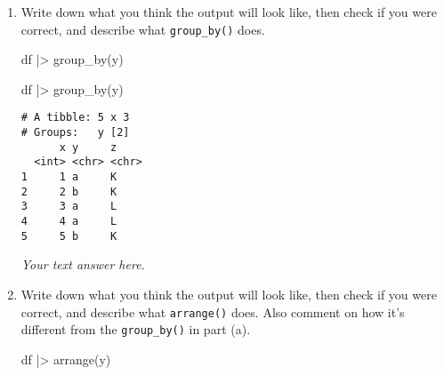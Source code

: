 \documentclass[
  letterpaper,
  DIV=11,
  numbers=noendperiod]{scrreprt}
\newenvironment{Shaded}{\begin{snugshade}}{\end{snugshade}}
\newcommand{\FunctionTok}[1]{\textcolor[rgb]{0.28,0.35,0.67}{#1}}
\newcommand{\NormalTok}[1]{\textcolor[rgb]{0.00,0.23,0.31}{#1}}
\newcommand{\SpecialCharTok}[1]{\textcolor[rgb]{0.37,0.37,0.37}{#1}}
\begin{document}
\begin{enumerate}
\def\labelenumi{\alph{enumi}.}
\item
  Write down what you think the output will look like, then check if you
  were correct, and describe what \texttt{group\_by()} does.

\begin{Shaded}
\begin{Highlighting}[]
\NormalTok{df }\SpecialCharTok{|\textgreater{}}
  \FunctionTok{group\_by}\NormalTok{(y)}
\end{Highlighting}
\end{Shaded}

  \begin{tcolorbox}[enhanced jigsaw, left=2mm, rightrule=.15mm, bottomtitle=1mm, opacitybacktitle=0.6, leftrule=.75mm, opacityback=0, colframe=quarto-callout-note-color-frame, bottomrule=.15mm, coltitle=black, toptitle=1mm, colback=white, titlerule=0mm, colbacktitle=quarto-callout-note-color!10!white, title={Answer}, toprule=.15mm, breakable, arc=.35mm]

\begin{Shaded}
\begin{Highlighting}[]
\NormalTok{df }\SpecialCharTok{|\textgreater{}}
  \FunctionTok{group\_by}\NormalTok{(y)}
\end{Highlighting}
\end{Shaded}

\begin{verbatim}
# A tibble: 5 x 3
# Groups:   y [2]
      x y     z    
  <int> <chr> <chr>
1     1 a     K    
2     2 b     K    
3     3 a     L    
4     4 a     L    
5     5 b     K    
\end{verbatim}

  \emph{Your text answer here.}

  \end{tcolorbox}
\item
  Write down what you think the output will look like, then check if you
  were correct, and describe what \texttt{arrange()} does. Also comment
  on how it's different from the \texttt{group\_by()} in part (a).

\begin{Shaded}
\begin{Highlighting}[]
\NormalTok{df }\SpecialCharTok{|\textgreater{}}
  \FunctionTok{arrange}\NormalTok{(y)}
\end{Highlighting}
\end{Shaded}

  \begin{tcolorbox}[enhanced jigsaw, left=2mm, rightrule=.15mm, bottomtitle=1mm, opacitybacktitle=0.6, leftrule=.75mm, opacityback=0, colframe=quarto-callout-note-color-frame, bottomrule=.15mm, coltitle=black, toptitle=1mm, colback=white, titlerule=0mm, colbacktitle=quarto-callout-note-color!10!white, title={Answer}, toprule=.15mm, breakable, arc=.35mm]


\end{tcolorbox}
\end{enumerate}
\end{document}
